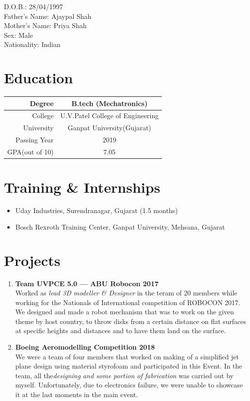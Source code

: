 \documentclass[margin,line]{res}
\begin{document}
\begin{resume}
D.O.B.: 28/04/1997\\
Father's Name: Ajaypal Shah\\
Mother's Name: Priya Shah\\
Sex: Male\\
Nationality: Indian


\section{\sc \bf Education}
\begin{tabular}{||r|c||}
	\hline
	Degree & B.tech (Mechatronics)\\
	\hline
	College & U.V.Patel College of Engineering\\
	\hline
	University & Ganpat University(Gujarat)\\
	\hline
	Passing Year & 2019\\
	\hline
	GPA(out of 10) & 7.05\\
	\hline
\end{tabular}

\section{\sc \bf Training \& Internships}
\begin{itemize}

\item Uday Industries, Surendranagar, Gujarat (1.5 months)
\item Bosch Rexroth Training Center, Ganpat University, Mehsana, Gujarat
\end{itemize}

\section{\sc \bf Projects}
\begin{enumerate}

\item {\bf Team UVPCE 5.0 --- ABU Robocon 2017}\\
Worked as {\em lead 3D modeller \& Designer} in the teram of 20 members while working for the Nationals of  International competition of ROBOCON 2017.\\
We designed and made a robot mechanism that was to work on the given theme by host country, to throw disks from a certain distance on flat surfaces at specific heights and distances and to have them land on the surface.

\item{\bf Boeing Aeromodelling Competition 2018}\\
We were a team of four members that worked on making of a simplified jet plane design using material styrofoam and participated in this Event. In the team, all the{\em designing and some portion of fabrication} was carried out by myself. Unfortunately, due to electronics failure, we were unable to showcase it at the last moments in the main event.


\end{enumerate}
\end{resume}
\end{document}
